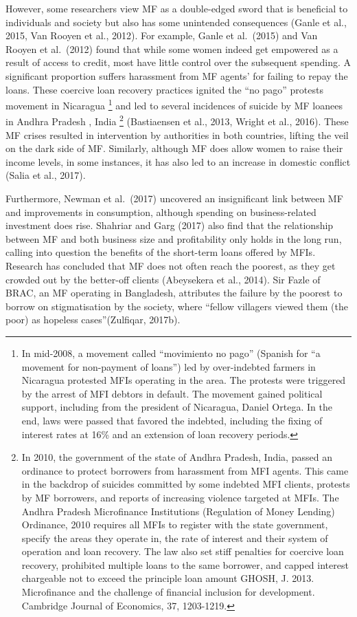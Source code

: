 \documentclass[a4paper, nobind]{templates/ociamthesis}
\begin{document}
However, some researchers view MF as a double-edged sword that is beneficial to individuals and society but also has some unintended consequences (Ganle et al., 2015, Van Rooyen et al., 2012). For example, Ganle et al.~(2015) and Van Rooyen et al.~(2012) found that while some women indeed get empowered as a result of access to credit, most have little control over the subsequent spending. A significant proportion suffers harassment from MF agents' for failing to repay the loans. These coercive loan recovery practices ignited the ``no pago'' protests movement in Nicaragua \footnote{In mid-2008, a movement called ``movimiento no pago'' (Spanish for ``a movement for non-payment of loans'') led by over-indebted farmers in Nicaragua protested MFIs operating in the area. The protests were triggered by the arrest of MFI debtors in default. The movement gained political support, including from the president of Nicaragua, Daniel Ortega. In the end, laws were passed that favored the indebted, including the fixing of interest rates at 16\% and an extension of loan recovery periods.} and led to several incidences of suicide by MF loanees in Andhra Pradesh , India \footnote{In 2010, the government of the state of Andhra Pradesh, India, passed an ordinance to protect borrowers from harassment from MFI agents. This came in the backdrop of suicides committed by some indebted MFI clients, protests by MF borrowers, and reports of increasing violence targeted at MFIs. The Andhra Pradesh Microfinance Institutions (Regulation of Money Lending) Ordinance, 2010 requires all MFIs to register with the state government, specify the areas they operate in, the rate of interest and their system of operation and loan recovery. The law also set stiff penalties for coercive loan recovery, prohibited multiple loans to the same borrower, and capped interest chargeable not to exceed the principle loan amount GHOSH, J. 2013. Microfinance and the challenge of financial inclusion for development. Cambridge Journal of Economics, 37, 1203-1219.} (Bastiaensen et al., 2013, Wright et al., 2016). These MF crises resulted in intervention by authorities in both countries, lifting the veil on the dark side of MF. Similarly, although MF does allow women to raise their income levels, in some instances, it has also led to an increase in domestic conflict (Salia et al., 2017).

Furthermore, Newman et al.~(2017) uncovered an insignificant link between MF and improvements in consumption, although spending on business-related investment does rise. Shahriar and Garg (2017) also find that the relationship between MF and both business size and profitability only holds in the long run, calling into question the benefits of the short-term loans offered by MFIs. Research has concluded that MF does not often reach the poorest, as they get crowded out by the better-off clients (Abeysekera et al., 2014). Sir Fazle of BRAC, an MF operating in Bangladesh, attributes the failure by the poorest to borrow on stigmatisation by the society, where ``fellow villagers viewed them (the poor) as hopeless cases''(Zulfiqar, 2017b).
\end{document}
